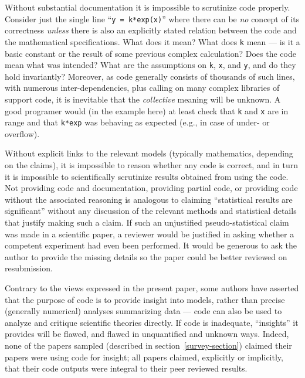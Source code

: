 \documentclass{comjnl}
\begin{document}
Without substantial documentation it is impossible to scrutinize code properly. Consider just the single line ``\texttt{y = k*exp(x)}'' where there can be \emph{no\/} concept of its correctness \emph{unless\/} there is also an explicitly stated relation between the code and the mathematical specifications. What does it mean? What does \texttt{k} mean --- is it a basic constant or the result of some previous complex calculation? Does the code mean what was intended? What are the assumptions on \texttt{k}, \texttt{x}, and \texttt{y}, and do they hold invariantly? Moreover, as code generally consists of thousands of such lines, with numerous inter-dependencies, plus calling on many complex libraries of support code, it is inevitable that the \emph{collective\/} meaning will be unknown. A good programer would (in the example here) at least check that \texttt{k} and \texttt{x} are in range and that \texttt{k*exp} was behaving as expected (e.g., in case of under- or overflow).

Without explicit links to the relevant models (typically mathematics, depending on the claims), it is impossible to reason whether any code is correct, and in turn it is impossible to scientifically scrutinize results obtained from using the code. Not providing code and documentation, providing partial code, or providing code without the associated reasoning is analogous to claiming ``statistical results are significant'' without any discussion of the relevant methods and statistical details that justify making such a claim. If such an unjustified pseudo-statistical claim was made in a scientific paper, a reviewer would be justified in asking whether a competent experiment had even been performed. It would be generous to ask the author to provide the missing details so the paper could be better reviewed on resubmission. 

Contrary to the views expressed in the present paper, some authors have asserted that the purpose of code is to provide insight into models, rather than precise (generally numerical) analyses summarizing data \cite{assessing-quality} --- code can also be used to analyze and critique scientific theories directly. If code is inadequate, ``insights'' it provides will be flawed, and flawed in unquantified and unknown ways. Indeed, none of the papers sampled (described in section~\ref{survey-section}) claimed their papers were using code for insight; all papers claimed, explicitly or implicitly, that their code outputs were integral to their peer reviewed results.
\end{document}
